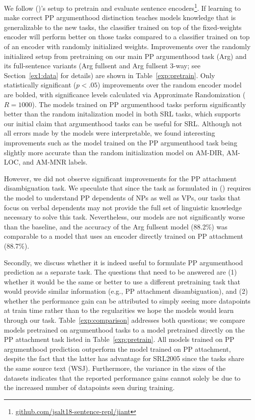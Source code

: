 \documentclass[letterpaper]{article} %
\begin{document}
We follow \citeauthor{bowman2018looking} (\citeyear{bowman2018looking})'s setup to pretrain and evaluate sentence encoders\footnote{\url{github.com/jsalt18-sentence-repl/jiant}}. If learning to make correct PP argumenthood distinction teaches models knowledge that is generalizable to the new tasks, the classifier trained on top of the fixed-weights encoder will perform better on those tasks compared to a classifier trained on top of an encoder with randomly initialized weights. Improvements over the randomly initialized setup from pretraining on our main PP argumenthood task (Arg) and its full-sentence variants (Arg fullsent and Arg fullsent 3-way; see Section~\ref{ex1:data} for details) are shown in Table~\ref{exp:pretrain}. Only statistically significant ($p<.05$) improvements over the random encoder model are bolded, with significance levels calculated via Approximate Randomization \cite{yeh2000more} ($R=1000$). The models trained on PP argumenthood tasks perform significantly better than the random initalization model in both SRL tasks, which supports our initial claim that argumenthood tasks can be useful for SRL. Although not all errors made by the models were interpretable, we found interesting improvements such as the model trained on the PP argumenthood task being slightly more accurate than the random initialization model on \textsc{AM-DIR, AM-LOC}, and \textsc{AM-MNR} labels.

However, we did not observe significant improvements for the PP attachment disambiguation task. We speculate that since the task as formulated in \citeauthor{belinkov2014exploring} (\citeyear{belinkov2014exploring}) requires the model to understand PP dependents of NPs as well as VPs, our tasks that focus on verbal dependents may not provide the full set of linguistic knowledge necessary to solve this task. Nevertheless, our models are not significantly worse than the baseline, and the accuracy of the Arg fullsent model (88.2\%) was comparable to a model that uses an encoder directly trained on PP attachment (88.7\%).

Secondly, we discuss whether it is indeed useful to formulate PP argumenthood prediction as a separate task. The questions that need to be answered are (1) whether it would be the same or better to use a different pretraining task that would provide similar information (e.g., PP attachment disambiguation), and (2) whether the performance gain can be attributed to simply seeing more datapoints at train time rather than to the regularities we hope the models would learn through our task. Table~\ref{exp:comparison} addresses both questions; we compare models pretrained on argumenthood tasks to a model pretrained directly on the PP attachment task listed in Table~\ref{exp:pretrain}. All models trained on PP argumenthood prediction outperform the model trained on PP attachment, despite the fact that the latter has advantage for SRL2005 since the tasks share the same source text (WSJ). Furthermore, the variance in the sizes of the datasets indicates that the reported performance gains cannot solely be due to the increased number of datapoints seen during training.
\end{document}
